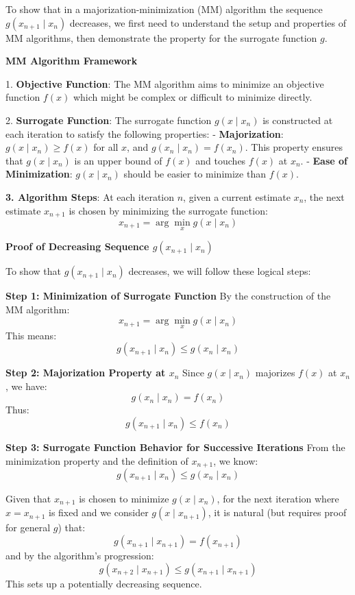 \documentclass[8pt]{article}
\begin{document}
{To show that in a majorization-minimization (MM) algorithm the sequence \(g(x_{n+1} \mid x_n)\) decreases, we first need to understand the setup and properties of MM algorithms, then demonstrate the property for the surrogate function \(g\).

\textbf{MM Algorithm Framework}

1. \textbf{Objective Function}:
   The MM algorithm aims to minimize an objective function \(f(x)\) which might be complex or difficult to minimize directly.

2. \textbf{Surrogate Function}:
   The surrogate function \(g(x \mid x_n)\) is constructed at each iteration to satisfy the following properties:
   - \textbf{Majorization}: \(g(x \mid x_n) \geq f(x)\) for all \(x\), and \(g(x_n \mid x_n) = f(x_n)\). This property ensures that \(g(x \mid x_n)\) is an upper bound of \(f(x)\) and touches \(f(x)\) at \(x_n\).
   - \textbf{Ease of Minimization}: \(g(x \mid x_n)\) should be easier to minimize than \(f(x)\).

\textbf{3. Algorithm Steps}:
   At each iteration \(n\), given a current estimate \(x_n\), the next estimate \(x_{n+1}\) is chosen by minimizing the surrogate function:
   \[
   x_{n+1} = \arg \min_x g(x \mid x_n)
   \]

\textbf{Proof of Decreasing Sequence \(g(x_{n+1} \mid x_n)\)}

To show that \(g(x_{n+1} \mid x_n)\) decreases, we will follow these logical steps:

\textbf{Step 1: Minimization of Surrogate Function}
By the construction of the MM algorithm:
\[
x_{n+1} = \arg \min_x g(x \mid x_n)
\]
This means:
\[
g(x_{n+1} \mid x_n) \leq g(x_n \mid x_n)
\]

\textbf{Step 2: Majorization Property at \(x_n\)}
Since \(g(x \mid x_n)\) majorizes \(f(x)\) at \(x_n\), we have:
\[
g(x_n \mid x_n) = f(x_n)
\]
Thus:
\[
g(x_{n+1} \mid x_n) \leq f(x_n)
\]

\textbf{Step 3: Surrogate Function Behavior for Successive Iterations}
From the minimization property and the definition of \(x_{n+1}\), we know:
\[
g(x_{n+1} \mid x_n) \leq g(x_n \mid x_n)
\]

Given that \(x_{n+1}\) is chosen to minimize \(g(x \mid x_n)\), for the next iteration where \(x = x_{n+1}\) is fixed and we consider \(g(x \mid x_{n+1})\), it is natural (but requires proof for general \(g\)) that:
\[
g(x_{n+1} \mid x_{n+1}) = f(x_{n+1})
\]
and by the algorithm’s progression:
\[
g(x_{n+2} \mid x_{n+1}) \leq g(x_{n+1} \mid x_{n+1})
\]
This sets up a potentially decreasing sequence.

}
\end{document}
